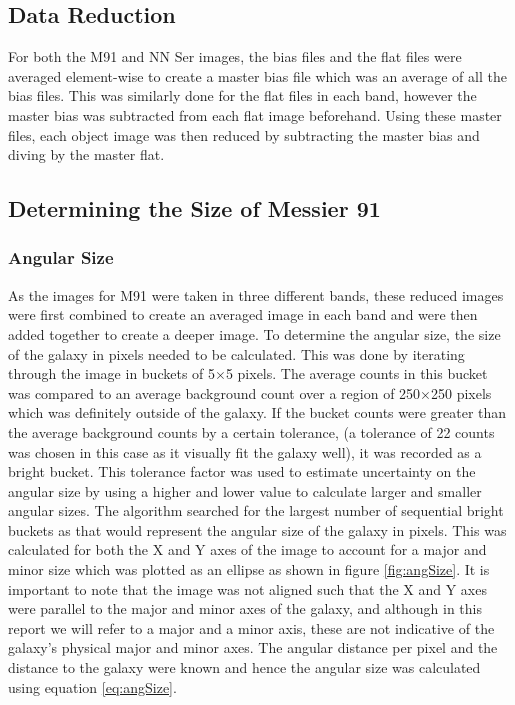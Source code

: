 \documentclass[%
reprint,
amsmath,amssymb,
aps,
]{revtex4-2}
\begin{document}
		\subsection{Data Reduction}
			
			 For both the M91 and NN Ser images, the bias files and the flat files were averaged element-wise to create a master bias file which was an average of all the bias files. This was similarly done for the flat files in each band, however the master bias was subtracted from each flat image beforehand. Using these master files, each object image was then reduced by subtracting the master bias and diving by the master flat.
		
		\subsection{Determining the Size of Messier 91}
			
			\subsubsection{Angular Size}
			
				As the images for M91 were taken in three different bands, these reduced images were first combined to create an averaged image in each band and were then added together to create a deeper image. To determine the angular size, the size of the galaxy in pixels needed to be calculated. This was done by iterating through the image in buckets of 5$\times$5 pixels. The average counts in this bucket was compared to an average background count over a region of 250$\times$250 pixels which was definitely outside of the galaxy. If the bucket counts were greater than the average background counts by a certain tolerance, (a tolerance of 22 counts was chosen in this case as it visually fit the galaxy well), it was recorded as a bright bucket. This tolerance factor was used to estimate uncertainty on the angular size by using a higher and lower value to calculate larger and smaller angular sizes. The algorithm searched for the largest number of sequential bright buckets as that would represent the angular size of the galaxy in pixels. This was calculated for both the X and Y axes of the image to account for a major and minor size which was plotted as an ellipse as shown in figure \ref{fig:angSize}. It is important to note that the image was not aligned such that the X and Y axes were parallel to the major and minor axes of the galaxy, and although in this report we will refer to a major and a minor axis, these are not indicative of the galaxy's physical major and minor axes. The angular distance per pixel and the distance to the galaxy were known and hence the angular size was calculated using equation \ref{eq:angSize}.
			
\end{document}

